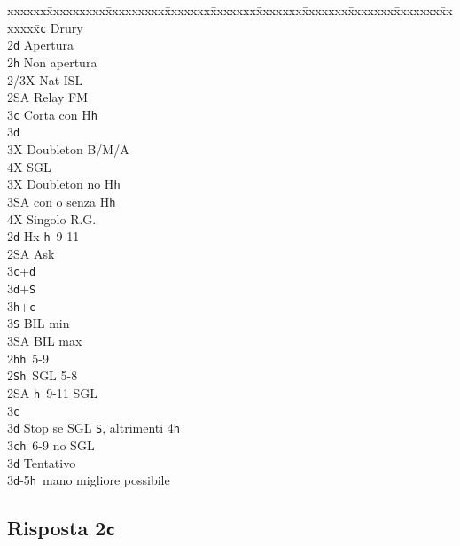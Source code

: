 \documentclass[a4paper,italian]{article}
\newcommand{\BS}{\small{\texttt{S}}}
\newcommand{\BC}{\small{\texttt{c}}}
\newcommand{\BD}{\small{\texttt{d}}}
\newcommand{\BH}{\small{\texttt{h}}}
\newcommand{\pdfc}{\texorpdfstring{\texttt{c}}{C}}
\newenvironment{bidtable}
{\begin{tabbing}

    xxxxxx\=xxxxxxxxx\=xxxxxxxxx\=xxxxxxx\=xxxxxxx\=xxxxxxx\=xxxxxxx\=xxxxxxx\=xxxxxxx\=xxxxxxx\=\kill}
{\end{tabbing} }%
\begin{document}
\begin{multicols}{2}
    \begin{bidtable}
        2\BC \> Drury\+\\
        2\BD \> Apertura\\
        2\BH \> Non apertura\\
        2/3X \> Nat ISL\\
        2\small{SA} \> Relay FM\+\\
        3\BC \> Corta con H\BH \+\\
        3\BD \> \textregistered\+\\
        3X \> Doubleton B/M/A\\
        4X \> SGL\-\-\\
        3X \> Doubleton no H\BH \\
        3\small{SA}  con o senza H\BH \\
        4X \> Singolo R.G.\-\-\\
        2\BD \> Hx \BH\ 9-11\+\\
        2\small{SA} \> Ask \+\\
        3\BC {}+\BD\\
        3\BD {}+\BS\\
        3\BH {}+\BC\\
        3\BS \> BIL min\\
        3\small{SA} \> BIL max\-\-\\
        2\BH {}\BH\ 5-9\\
        2\BS {}\BH\ SGL 5-8\\
        2\small{SA} \BH\ 9-11 SGL\+\\
        3\BC \> \textregistered\\
        3\BD \> Stop se SGL \BS, altrimenti 4\BH\-\\
        3\BC {}\BH\ 6-9 no SGL\+\\
        3\BD \> Tentativo \-\\
        3\BD {}-5\BH\ mano migliore possibile\\
    \end{bidtable}
    \bigbreak

\end{multicols}

\pagebreak

\subsection{Risposta 2\pdfc}
\end{document}
